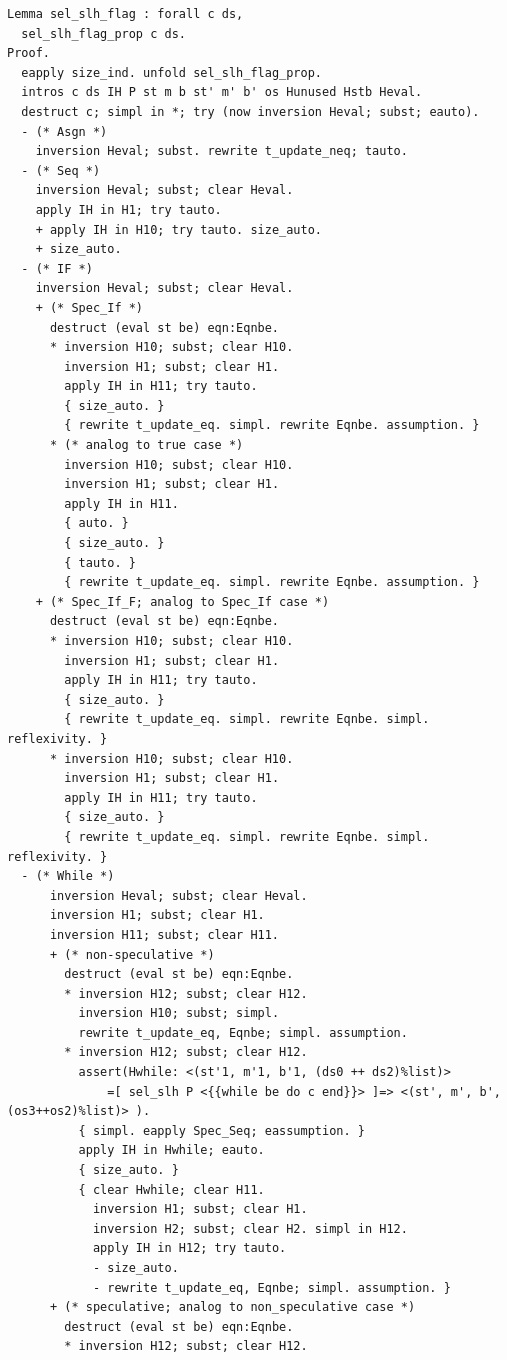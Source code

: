 \documentclass[12pt]{report}
\begin{document}
\begin{verbatim}
Lemma sel_slh_flag : forall c ds,
  sel_slh_flag_prop c ds.
Proof.
  eapply size_ind. unfold sel_slh_flag_prop.
  intros c ds IH P st m b st' m' b' os Hunused Hstb Heval.
  destruct c; simpl in *; try (now inversion Heval; subst; eauto).
  - (* Asgn *)
    inversion Heval; subst. rewrite t_update_neq; tauto.
  - (* Seq *)
    inversion Heval; subst; clear Heval.
    apply IH in H1; try tauto.
    + apply IH in H10; try tauto. size_auto.
    + size_auto.
  - (* IF *)
    inversion Heval; subst; clear Heval.
    + (* Spec_If *)
      destruct (eval st be) eqn:Eqnbe.
      * inversion H10; subst; clear H10.
        inversion H1; subst; clear H1.
        apply IH in H11; try tauto.
        { size_auto. }
        { rewrite t_update_eq. simpl. rewrite Eqnbe. assumption. }
      * (* analog to true case *)
        inversion H10; subst; clear H10.
        inversion H1; subst; clear H1.
        apply IH in H11.
        { auto. }
        { size_auto. }
        { tauto. }
        { rewrite t_update_eq. simpl. rewrite Eqnbe. assumption. }
    + (* Spec_If_F; analog to Spec_If case *)
      destruct (eval st be) eqn:Eqnbe.
      * inversion H10; subst; clear H10.
        inversion H1; subst; clear H1.
        apply IH in H11; try tauto.
        { size_auto. }
        { rewrite t_update_eq. simpl. rewrite Eqnbe. simpl. reflexivity. }
      * inversion H10; subst; clear H10.
        inversion H1; subst; clear H1.
        apply IH in H11; try tauto.
        { size_auto. }
        { rewrite t_update_eq. simpl. rewrite Eqnbe. simpl. reflexivity. }
  - (* While *)
      inversion Heval; subst; clear Heval.
      inversion H1; subst; clear H1.
      inversion H11; subst; clear H11.
      + (* non-speculative *)
        destruct (eval st be) eqn:Eqnbe.
        * inversion H12; subst; clear H12.
          inversion H10; subst; simpl.
          rewrite t_update_eq, Eqnbe; simpl. assumption.
        * inversion H12; subst; clear H12.
          assert(Hwhile: <(st'1, m'1, b'1, (ds0 ++ ds2)%list)>
              =[ sel_slh P <{{while be do c end}}> ]=> <(st', m', b', (os3++os2)%list)> ).
          { simpl. eapply Spec_Seq; eassumption. }
          apply IH in Hwhile; eauto.
          { size_auto. }
          { clear Hwhile; clear H11.
            inversion H1; subst; clear H1.
            inversion H2; subst; clear H2. simpl in H12.
            apply IH in H12; try tauto.
            - size_auto.
            - rewrite t_update_eq, Eqnbe; simpl. assumption. }
      + (* speculative; analog to non_speculative case *)
        destruct (eval st be) eqn:Eqnbe.
        * inversion H12; subst; clear H12.

\end{verbatim}
\end{document}
